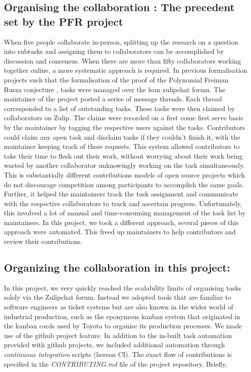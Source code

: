 \subsection{Organising the collaboration : The precedent set by the PFR project}
When five people collaborate in-person, splitting up the research on a question into subtasks and assigning them to collaborators can be accomplished by discussion and consensus. When there are more than fifty collaborators working together online, a more systematic approach is required. In previous formalisation projects such that the formalisation of the proof of the Polynomial Freiman Rusza conjecture \cite{PFR_Tao_Dilles_2023}, tasks were managed over the lean zulipchat forum. The maintainer of the project posted a series of message threads. Each thread corresponded to a list of outstanding tasks. These tasks were then claimed by collaborators on Zulip. The claims were recorded on a first come first serve basis by the maintainer by tagging the respective users against the tasks. Contributors could claim any open task and disclaim tasks if they couldn't finish it, with the maintainer keeping track of these requests. This system allowed contributors to take their time to flesh out their work, without worrying about their work being wasted by another collaborator unknowingly working on the task simultaneously. This is substantially different contributions models of open source projects which do not discourage competition among participants to accomplish the same goals. Further, it helped the maintainers track the task assignment and communicate with the respective collaborators to track and ascertain progress. Unfortunately, this involved a lot of manual and time-consuming management of the task list by maintainers. In this project, we took a different approach, several pieces of this approach were automated. This freed up maintainers to help contributors and review their contributions.

\subsection{Organizing the collaboration in this project:}
In this project, we very quickly reached the scalability limits of organising tasks solely via the Zulipchat forum. Instead we adopted tools that are familiar to software engineers as ticket systems but are also known in the wider world of industrial production, such as the eponymous kanban system that originated in the kanban cards used by Toyota to organise its production processes. We made use of the github project feature. In addition to the in-built task automation provided with github projects, we included additional automation through \emph{continuous integration} scripts (hereon CI). The exact flow of contributions is specified in the \emph{CONTRIBUTING.md} file of the project repository. Briefly,

